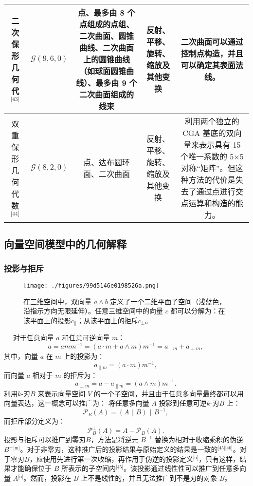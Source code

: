 \begin{table}[ht]
\begin{tabular}{|c|c|c|c|c|}
\hline
二次保形几何代\(^\text{[43]}\) & $\mathcal{G}(9,6,0)$ & 点、最多由 8 个点组成的点组、二次曲面、圆锥曲线、二次曲面上的圆锥曲线（如球面圆锥曲线）、最多由 9 个二次曲面组成的线束 & 反射、平移、旋转、缩放及其他变换 & 二次曲面可以通过控制点构造，并且可以确定其表面法线。 \\
\hline
双重保形几何代数\(^\text{[44]}\) & $\mathcal{G}(8,2,0)$ & 点、达布圆环面、二次曲面 & 反射、平移、旋转、缩放及其他变换 & 利用两个独立的 CGA 基底的双向量来表示具有 15 个唯一系数的 5×5 对称“矩阵”。但这种方法的代价是失去了通过点进行交点运算和构造的能力。\\
\hline
\end{tabular}
\end{table}
\subsection{向量空间模型中的几何解释}
\subsubsection{投影与拒斥}
\begin{figure}[ht]
\centering
\texttt{[image: ./figures/99d5146e0198526a.png]}
\caption{在三维空间中，双向量 $a \wedge b$ 定义了一个二维平面子空间（浅蓝色，沿指示方向无限延伸）。任意三维空间中的向量 $c$ 都可以分解为：在该平面上的投影$c_{\parallel}$；从该平面上的拒斥$c_{\perp}$。} \label{fig_jiheds_6}
\end{figure} 
对于任意向量 $a$ 和任意可逆向量 $m$：
$$
a = a m m^{-1} = (a \cdot m + a \wedge m)m^{-1} = a_{\parallel m} + a_{\perp m},~
$$
其中，向量 $a$ 在 $m$ 上的投影为：
$$
a_{\parallel m} = (a \cdot m)m^{-1},~
$$
而向量 $a$ 相对于 $m$ 的拒斥为：
$$
a_{\perp m} = a - a_{\parallel m} = (a \wedge m)m^{-1}.~
$$
利用$k$-刃$B$ 来表示向量空间 $V$ 的一个子空间，并且由于任意多向量最终都可以用向量表达，这一概念可以推广为：
将任意多向量 $A$ 投影到任意可逆$k$-刃$B$ 上：
$$
\mathcal{P}_{B}(A) = (A \;\rfloor\; B) \;\rfloor\; B^{-1},~
$$
而拒斥部分定义为：
$$
\mathcal{P}_{B}^{\perp}(A) = A - \mathcal{P}_{B}(A).~
$$
投影与拒斥可以推广到零刃$B$，方法是将逆元 $B^{-1}$ 替换为相对于收缩乘积的伪逆$B^{+}$\(^\text{[m]}\)。对于非零刃，这种推广后的投影结果与原始定义的结果是一致的\(^\text{[45][46]}\)。对于零刃$B$，应使用先进行第一次收缩，再作用于伪逆的投影定义\(^\text{[n]}\)，只有这样，结果才能确保位于 $B$ 所表示的子空间内\(^\text{[45]}\)。该投影通过线性性可以推广到任意多向量 $A$\(^\text{[o]}\)。然而，投影在 $B$ 上不是线性的，并且无法推广到不是刃的对象 $B$。
